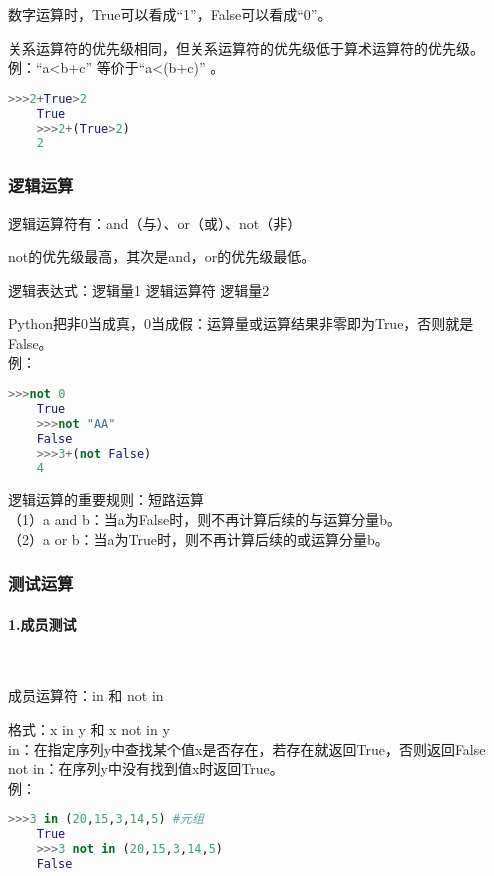 \documentclass[11pt,a4paper]{article}
\begin{document}
数字运算时，True可以看成“1”，False可以看成“0”。

关系运算符的优先级相同，但关系运算符的优先级低于算术运算符的优先级。\\
例：“a<b+c” 等价于“a<(b+c)” 。
\begin{lstlisting}[language={Python}]
    >>>2+True>2
    True
    >>>2+(True>2)
    2
\end{lstlisting}

\subsubsection{逻辑运算}

逻辑运算符有：and（与）、or（或）、not（非）

not的优先级最高，其次是and，or的优先级最低。

逻辑表达式：逻辑量1 逻辑运算符 逻辑量2

Python把非0当成真，0当成假：运算量或运算结果非零即为True，否则就是False。\\
例：
\begin{lstlisting}[language={Python}]
    >>>not 0
    True
    >>>not "AA"
    False
    >>>3+(not False)
    4
\end{lstlisting}

逻辑运算的重要规则：短路运算\\
（1）a and b：当a为False时，则不再计算后续的与运算分量b。\\
（2）a or b：当a为True时，则不再计算后续的或运算分量b。

\subsubsection{测试运算}

\paragraph{1.成员测试}~{}

成员运算符：in 和 not in

格式：x in y 和 x not in y\\
in：在指定序列y中查找某个值x是否存在，若存在就返回True，否则返回False\\
not in：在序列y中没有找到值x时返回True。\\
例：
\begin{lstlisting}[language={Python}]
    >>>3 in (20,15,3,14,5) #元组
    True
    >>>3 not in (20,15,3,14,5)
    False
\end{lstlisting}
\end{document}
